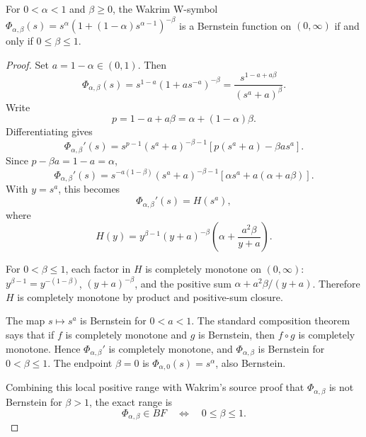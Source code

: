 \begin{proposition}
\label{res:wakrim-w-symbol-exact-bf-range}
For \(0<\alpha<1\) and \(\beta\ge0\), the Wakrim W-symbol \(\Phi_{\alpha,\beta}(s)=s^\alpha(1+(1-\alpha)s^{\alpha-1})^{-\beta}\) is a Bernstein function on \((0,\infty)\) if and only if \(0\le\beta\le1\).
\end{proposition}
\begin{proof}
Set \(a=1-\alpha\in(0,1)\). Then
\[
\Phi_{\alpha,\beta}(s)
=s^{1-a}\left(1+a s^{-a}\right)^{-\beta}
=\frac{s^{1-a+a\beta}}{(s^a+a)^\beta}.
\]
Write
\[
p=1-a+a\beta=\alpha+(1-\alpha)\beta.
\]
Differentiating gives
\[
\Phi_{\alpha,\beta}'(s)
=s^{p-1}(s^a+a)^{-\beta-1}
\left[p(s^a+a)-\beta a s^a\right].
\]
Since \(p-\beta a=1-a=\alpha\),
\[
\Phi_{\alpha,\beta}'(s)
=s^{-a(1-\beta)}(s^a+a)^{-\beta-1}
\left[\alpha s^a+a(\alpha+a\beta)\right].
\]
With \(y=s^a\), this becomes
\[
\Phi_{\alpha,\beta}'(s)=H(s^a),
\]
where
\[
H(y)=
y^{\beta-1}(y+a)^{-\beta}
\left(\alpha+\frac{a^2\beta}{y+a}\right).
\]

For \(0<\beta\le1\), each factor in \(H\) is completely monotone on \((0,\infty)\): \(y^{\beta-1}=y^{-(1-\beta)}\), \((y+a)^{-\beta}\), and the positive sum \(\alpha+a^2\beta/(y+a)\). Therefore \(H\) is completely monotone by product and positive-sum closure.

The map \(s\mapsto s^a\) is Bernstein for \(0<a<1\). The standard composition theorem says that if \(f\) is completely monotone and \(g\) is Bernstein, then \(f\circ g\) is completely monotone. Hence \(\Phi_{\alpha,\beta}'\) is completely monotone, and \(\Phi_{\alpha,\beta}\) is Bernstein for \(0<\beta\le1\). The endpoint \(\beta=0\) is \(\Phi_{\alpha,0}(s)=s^\alpha\), also Bernstein.

Combining this local positive range with Wakrim's source proof that \(\Phi_{\alpha,\beta}\) is not Bernstein for \(\beta>1\), the exact range is
\[
\Phi_{\alpha,\beta}\in BF
\quad\Longleftrightarrow\quad
0\le\beta\le1.
\]
\end{proof}

